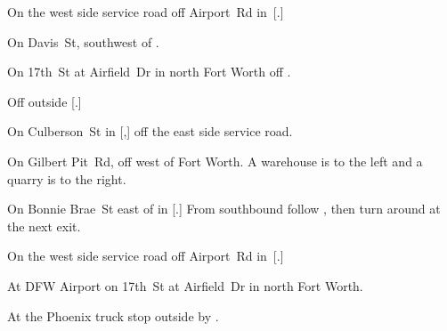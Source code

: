 
\begin{LocationList}

On the west side  service road off  Airport~Rd in~[.]

On  Davis~St, southwest of  .

On 17th~St at Airfield~Dr in north Fort Worth off .

Off  outside [.]

On Culberson~St in [,] off the east side  service road.

On Gilbert Pit~Rd, off  west of Fort Worth.
A warehouse is to the left and a quarry is to the right.

On Bonnie Brae~St east of  in [.]
From  southbound follow , then turn around at the next exit.

On the west side  service road off  Airport~Rd in~[.]

At DFW Airport on 17th~St at Airfield~Dr in north Fort Worth.

At the Phoenix truck stop outside  by  .

\end{LocationList}
